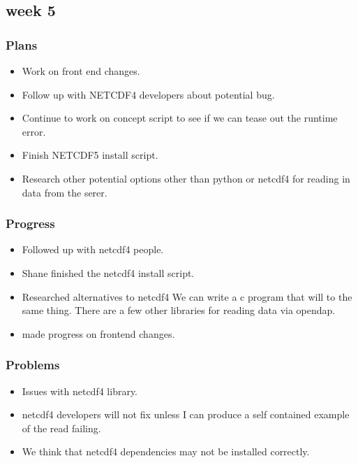 \documentclass[onecolumn, draftclsnofoot,10pt, compsoc]{article}
\begin{document}
		\subsection{week 5}
			\subsubsection{Plans}
				\begin{itemize}
					\item Work on front end changes.
					\item Follow up with NETCDF4 developers about potential bug.
					\item Continue to work on concept script to see if we can tease out the runtime error.
					\item Finish NETCDF5 install script.
					\item Research other potential options other than python or netcdf4 for reading in data from the serer.\\

				\end{itemize}
			\subsubsection{Progress}
				\begin{itemize}
					\item Followed up with netcdf4 people.
					\item Shane finished the netcdf4 install script.
					\item Researched alternatives to netcdf4 We can write a c program that will to the same thing. There are a few other libraries for reading data via opendap.
					\item made progress on frontend changes.
				\end{itemize}

			\subsubsection{Problems}
				\begin{itemize}
					\item Issues with netcdf4 library.
					\item netcdf4 developers will not fix unless I can produce a self contained example of the read failing.
					\item We think that netcdf4 dependencies may not be installed correctly.
				\end{itemize}
\end{document}
